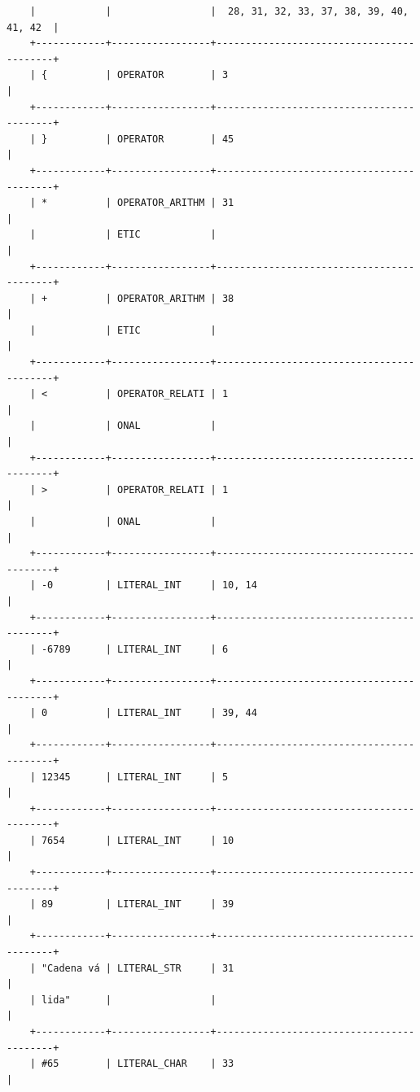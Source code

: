 \documentclass[a4paper,12pt]{article}
\begin{document}
\begin{flushleft}
\begin{verbatim}
	|            |                 |  28, 31, 32, 33, 37, 38, 39, 40, 41, 42  |
	+------------+-----------------+------------------------------------------+
	| {          | OPERATOR        | 3                                        |
	+------------+-----------------+------------------------------------------+
	| }          | OPERATOR        | 45                                       |
	+------------+-----------------+------------------------------------------+
	| *          | OPERATOR_ARITHM | 31                                       |
	|            | ETIC            |                                          |
	+------------+-----------------+------------------------------------------+
	| +          | OPERATOR_ARITHM | 38                                       |
	|            | ETIC            |                                          |
	+------------+-----------------+------------------------------------------+
	| <          | OPERATOR_RELATI | 1                                        |
	|            | ONAL            |                                          |
	+------------+-----------------+------------------------------------------+
	| >          | OPERATOR_RELATI | 1                                        |
	|            | ONAL            |                                          |
	+------------+-----------------+------------------------------------------+
	| -0         | LITERAL_INT     | 10, 14                                   |
	+------------+-----------------+------------------------------------------+
	| -6789      | LITERAL_INT     | 6                                        |
	+------------+-----------------+------------------------------------------+
	| 0          | LITERAL_INT     | 39, 44                                   |
	+------------+-----------------+------------------------------------------+
	| 12345      | LITERAL_INT     | 5                                        |
	+------------+-----------------+------------------------------------------+
	| 7654       | LITERAL_INT     | 10                                       |
	+------------+-----------------+------------------------------------------+
	| 89         | LITERAL_INT     | 39                                       |
	+------------+-----------------+------------------------------------------+
	| "Cadena vá | LITERAL_STR     | 31                                       |
	| lida"      |                 |                                          |
	+------------+-----------------+------------------------------------------+
	| #65        | LITERAL_CHAR    | 33                                       |

\end{verbatim}
\end{flushleft}
\end{document}
